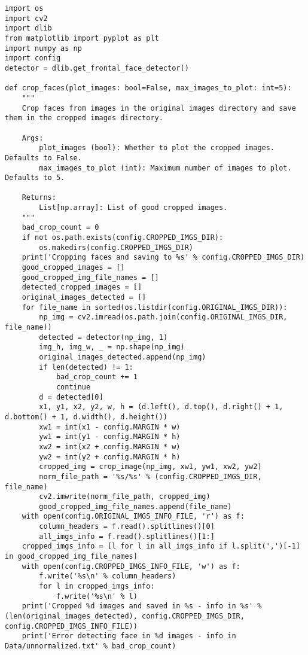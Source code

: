 \begin{verbatim}
import os
import cv2
import dlib
from matplotlib import pyplot as plt
import numpy as np
import config
detector = dlib.get_frontal_face_detector()

def crop_faces(plot_images: bool=False, max_images_to_plot: int=5):
    """
    Crop faces from images in the original images directory and save them in the cropped images directory.

    Args: 
        plot_images (bool): Whether to plot the cropped images. Defaults to False.
        max_images_to_plot (int): Maximum number of images to plot. Defaults to 5.
    
    Returns:
        List[np.array]: List of good cropped images.
    """
    bad_crop_count = 0
    if not os.path.exists(config.CROPPED_IMGS_DIR):
        os.makedirs(config.CROPPED_IMGS_DIR)
    print('Cropping faces and saving to %s' % config.CROPPED_IMGS_DIR)
    good_cropped_images = []
    good_cropped_img_file_names = []
    detected_cropped_images = []
    original_images_detected = []
    for file_name in sorted(os.listdir(config.ORIGINAL_IMGS_DIR)):
        np_img = cv2.imread(os.path.join(config.ORIGINAL_IMGS_DIR, file_name))
        detected = detector(np_img, 1)
        img_h, img_w, _ = np.shape(np_img)
        original_images_detected.append(np_img)
        if len(detected) != 1:
            bad_crop_count += 1
            continue
        d = detected[0]
        x1, y1, x2, y2, w, h = (d.left(), d.top(), d.right() + 1, d.bottom() + 1, d.width(), d.height())
        xw1 = int(x1 - config.MARGIN * w)
        yw1 = int(y1 - config.MARGIN * h)
        xw2 = int(x2 + config.MARGIN * w)
        yw2 = int(y2 + config.MARGIN * h)
        cropped_img = crop_image(np_img, xw1, yw1, xw2, yw2)
        norm_file_path = '%s/%s' % (config.CROPPED_IMGS_DIR, file_name)
        cv2.imwrite(norm_file_path, cropped_img)
        good_cropped_img_file_names.append(file_name)
    with open(config.ORIGINAL_IMGS_INFO_FILE, 'r') as f:
        column_headers = f.read().splitlines()[0]
        all_imgs_info = f.read().splitlines()[1:]
    cropped_imgs_info = [l for l in all_imgs_info if l.split(',')[-1] in good_cropped_img_file_names]
    with open(config.CROPPED_IMGS_INFO_FILE, 'w') as f:
        f.write('%s\n' % column_headers)
        for l in cropped_imgs_info:
            f.write('%s\n' % l)
    print('Cropped %d images and saved in %s - info in %s' % (len(original_images_detected), config.CROPPED_IMGS_DIR, config.CROPPED_IMGS_INFO_FILE))
    print('Error detecting face in %d images - info in Data/unnormalized.txt' % bad_crop_count)

\end{verbatim}
